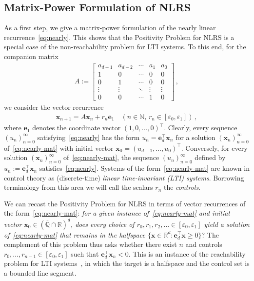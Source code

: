 \documentclass[a4paper,UKenglish,cleveref, autoref, thm-restate]{lipics-v2021}
\begin{document}
\subsection{Matrix-Power Formulation of NLRS}
As a first step, we give a matrix-power formulation of the nearly
linear recurrence~\eqref{eq:nearly}.  This shows that the Positivity
Problem for NLRS is a special case of the non-reachability problem for
LTI systems.  To this end, for the companion matrix
\begin{gather}
A :=
\begin{bmatrix}
a_{d-1} & a_{d-2} & \cdots & a_1 & a_0 \\
1 & 0 & \cdots &0 & 0 \\
0 & 1 &  \cdots & 0& 0 \\
\vdots & \vdots & \ddots & \vdots& \vdots \\
0 &  0 & \cdots & 1& 0
\end{bmatrix}\, ,
\label{eq:MAT}
\end{gather}
we consider the vector recurrence 
\begin{gather}
    \boldsymbol x_{n+1} = A\boldsymbol  x_n+r_n \boldsymbol e_1 \quad (n\in \mathbb N,\, r_n \in [\varepsilon_0,\varepsilon_1]) \, ,
\label{eq:nearly-mat}
\end{gather}  
where $\boldsymbol e_1$ denotes the coordinate vector $(1,0,\ldots,0)^\top$.
Clearly, every sequence $(u_n)_{n=0}^\infty$ satisfying~\eqref{eq:nearly} has the form $u_n=\boldsymbol e_d^\top \boldsymbol x_n$ for 
a solution $(\boldsymbol x_n)_{n=0}^\infty$ of~\eqref{eq:nearly-mat} with initial vector $\boldsymbol x_0 = (u_{d-1},\ldots,u_0)^\top$.
Conversely, for every solution $(\boldsymbol x_n)_{n=0}^\infty$ of~\eqref{eq:nearly-mat}, the sequence 
$(u_n)_{n=0}^\infty$ defined by $u_n :=\boldsymbol e_d^\top \boldsymbol x_n$ satisfies~\eqref{eq:nearly}.
Systems of the form~\eqref{eq:nearly-mat}
are known in control theory as  (discrete-time) \emph{linear time-invariant (LTI)
  systems}.
  Borrowing terminology from this area we will call the
scalars $r_n$ the \emph{controls}.  

We can recast the Positivity Problem for NLRS in terms of vector
recurrences of the form~\eqref{eq:nearly-mat}: \emph{for a given
  instance of~\eqref{eq:nearly-mat} and initial vector
  $\boldsymbol x_0 \in (\overline{\mathbb Q}\cap\mathbb R)^d$, does every choice of 
  $r_0,r_1,r_2,\ldots \in [\varepsilon_0,\varepsilon_1]$ yield a solution
  of~\eqref{eq:nearly-mat} that remains in the halfspace
  $\{ \boldsymbol x \in \mathbb R^d : \boldsymbol e_d^\top \boldsymbol
  x \geq 0 \}$}?  The complement of this problem thus asks
whether there exist $n$ and controls
$r_0,\ldots,r_{n-1} \in [\varepsilon_0,\varepsilon_1]$ such that
$\boldsymbol e_d^\top \boldsymbol x_n < 0$.  This is an instance of
the reachability problem for LTI
systems~\cite{AsarinDG03,FijalkowOPP019}, in which the target is a
halfspace and the control set is a bounded line segment.
\end{document}
